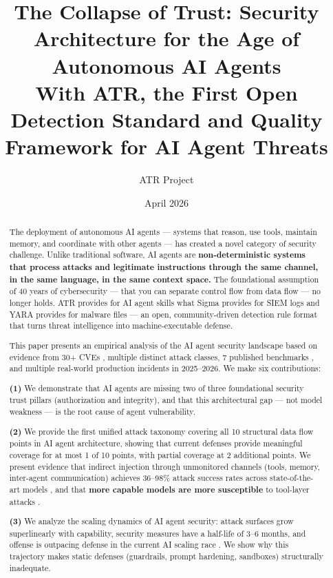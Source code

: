 \documentclass[11pt,letterpaper]{article}
\title{The Collapse of Trust: Security Architecture for the Age of Autonomous AI Agents\\[0.5em]
\large With ATR, the First Open Detection Standard and Quality Framework for AI Agent Threats}
\author{ATR Project}
\date{April 2026}
\begin{document}
\maketitle

\begin{abstract}
The deployment of autonomous AI agents --- systems that reason, use tools, maintain memory, and coordinate with other agents --- has created a novel category of security challenge. Unlike traditional software, AI agents are \textbf{non-deterministic systems that process attacks and legitimate instructions through the same channel, in the same language, in the same context space.} The foundational assumption of 40 years of cybersecurity --- that you can separate control flow from data flow --- no longer holds. ATR provides for AI agent skills what Sigma provides for SIEM logs and YARA provides for malware files --- an open, community-driven detection rule format that turns threat intelligence into machine-executable defense.

This paper presents an empirical analysis of the AI agent security landscape based on evidence from 30+ CVEs \cite{cve6514,cve53773,cvegit,cve49596,cve59536,postmark,sandworm}, multiple distinct attack classes, 7 published benchmarks \cite{pint,mcptox,asb,aishell,hacka,tensortrust,caibench}, and multiple real-world production incidents in 2025--2026. We make six contributions:

\textbf{(1)} We demonstrate that AI agents are missing two of three foundational security trust pillars (authorization and integrity), and that this architectural gap --- not model weakness --- is the root cause of agent vulnerability.

\textbf{(2)} We provide the first unified attack taxonomy covering all 10 structural data flow points in AI agent architecture, showing that current defenses provide meaningful coverage for at most 1 of 10 points, with partial coverage at 2 additional points. We present evidence that indirect injection through unmonitored channels (tools, memory, inter-agent communication) achieves 36--98\% attack success rates across state-of-the-art models \cite{mcptox,minja,asb}, and that \textbf{more capable models are more susceptible} to tool-layer attacks \cite{mcptoxbench}.

\textbf{(3)} We analyze the scaling dynamics of AI agent security: attack surfaces grow superlinearly with capability, security measures have a half-life of 3--6 months, and offense is outpacing defense in the current AI scaling race \cite{aisafety}. We show why this trajectory makes static defenses (guardrails, prompt hardening, sandboxes) structurally inadequate.


\end{abstract}
\end{document}
